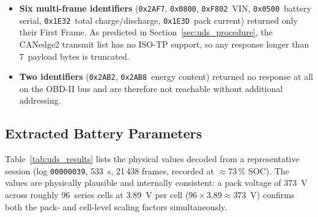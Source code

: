 \documentclass[11pt,a4paper,oneside,parskip=half]{scrreprt}
\providecommand{\hex}{}\renewcommand{\hex}[1]{\texttt{0x#1}}
\begin{document}
\begin{itemize}
  \item \textbf{Six multi-frame identifiers} (\hex{2AF7}, \hex{0800}, \hex{F802}~VIN, \hex{0500}~battery serial, \hex{1E32}~total charge/dis\-charge, \hex{1E3D}~pack current) returned only their First Frame. As predicted in Section~\ref{sec:uds_procedure}, the CANedge2 transmit list has no ISO-TP support, so any response longer than 7~payload bytes is truncated.
  \item \textbf{Two identifiers} (\hex{2AB2}, \hex{2AB8}~energy content) returned no response at all on the OBD-II bus and are therefore not reachable without additional addressing.
\end{itemize}

\subsection{Extracted Battery Parameters}
Table~\ref{tab:uds_results} lists the physical values decoded from a representative session (log \texttt{00000039}, 533~s, 21\,438 frames, recorded at $\approx$73\,\% SOC). The values are physically plausible and internally consistent: a pack voltage of 373~V across roughly 96~series cells at 3.89~V per cell ($96\times3.89\approx373$~V) confirms both the pack- and cell-level scaling factors simultaneously.
\end{document}
